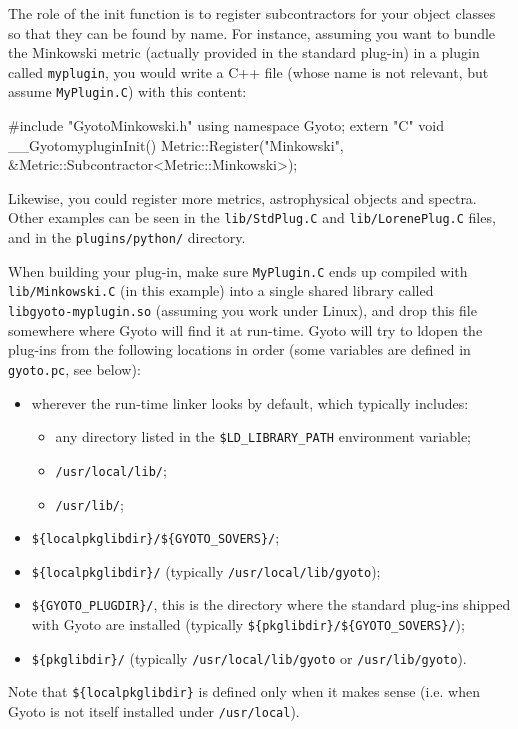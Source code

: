 \documentclass[a4paper,12pt]{article}
\begin{document}
The role of the init function is to register subcontractors for your
object classes so that they can be found by name. For instance,
assuming you want to bundle the Minkowski metric (actually provided in
the standard plug-in) in a plugin called \texttt{myplugin}, you would
write a C++ file (whose name is not relevant, but assume
\texttt{MyPlugin.C}) with this content:

\begin{code}
#include "GyotoMinkowski.h"
using namespace Gyoto;
extern "C" void __GyotomypluginInit() {
  Metric::Register("Minkowski", \&Metric::Subcontractor<Metric::Minkowski>);
}
\end{code}

Likewise, you could register more metrics, astrophysical objects and
spectra. Other examples can be seen in the \texttt{lib/StdPlug.C} and
\texttt{lib/LorenePlug.C} files, and in the \texttt{plugins/python/}
directory.

When building your plug-in, make sure \texttt{MyPlugin.C} ends up
compiled with\\ \texttt{lib/Minkowski.C} (in this example) into a
single shared library called\\ \texttt{libgyoto-myplugin.so} (assuming
you work under Linux), and drop this file somewhere where Gyoto
will find it at run-time. Gyoto will try to ldopen the plug-ins from
the following locations in order (some variables are defined in
\texttt{gyoto.pc}, see below):
\begin{itemize}
\item wherever the run-time linker looks by default, which typically
  includes:
  \begin{itemize}
  \item any directory listed in the \texttt{\$LD\_LIBRARY\_PATH}
    environment variable;
  \item \texttt{/usr/local/lib/};
  \item \texttt{/usr/lib/};
  \end{itemize}
\item \texttt{\$\{localpkglibdir\}/\$\{GYOTO\_SOVERS\}/};
\item \texttt{\$\{localpkglibdir\}/} (typically \texttt{/usr/local/lib/gyoto});
\item \texttt{\$\{GYOTO\_PLUGDIR\}/}, this is the directory where the
  standard plug-ins shipped with Gyoto are installed (typically
  \texttt{\$\{pkglibdir\}/\$\{GYOTO\_SOVERS\}/});
\item \texttt{\$\{pkglibdir\}/} (typically
  \texttt{/usr/local/lib/gyoto} or \texttt{/usr/lib/gyoto}).
\end{itemize}
Note that \texttt{\$\{localpkglibdir\}} is defined only when it makes
sense (i.e. when Gyoto is not itself installed under \texttt{/usr/local}).
\end{document}
